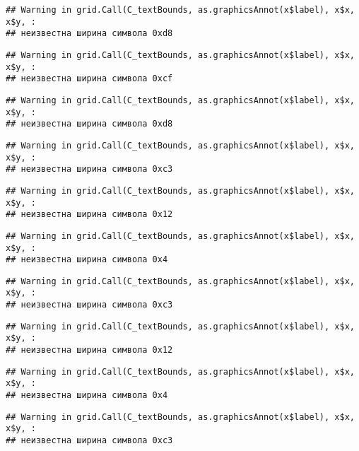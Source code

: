\documentclass[
]{article}
\begin{document}
\begin{verbatim}
## Warning in grid.Call(C_textBounds, as.graphicsAnnot(x$label), x$x, x$y, :
## неизвестна ширина символа 0xd8
\end{verbatim}

\begin{verbatim}
## Warning in grid.Call(C_textBounds, as.graphicsAnnot(x$label), x$x, x$y, :
## неизвестна ширина символа 0xcf
\end{verbatim}

\begin{verbatim}
## Warning in grid.Call(C_textBounds, as.graphicsAnnot(x$label), x$x, x$y, :
## неизвестна ширина символа 0xd8
\end{verbatim}

\begin{verbatim}
## Warning in grid.Call(C_textBounds, as.graphicsAnnot(x$label), x$x, x$y, :
## неизвестна ширина символа 0xc3
\end{verbatim}

\begin{verbatim}
## Warning in grid.Call(C_textBounds, as.graphicsAnnot(x$label), x$x, x$y, :
## неизвестна ширина символа 0x12
\end{verbatim}

\begin{verbatim}
## Warning in grid.Call(C_textBounds, as.graphicsAnnot(x$label), x$x, x$y, :
## неизвестна ширина символа 0x4
\end{verbatim}

\begin{verbatim}
## Warning in grid.Call(C_textBounds, as.graphicsAnnot(x$label), x$x, x$y, :
## неизвестна ширина символа 0xc3
\end{verbatim}

\begin{verbatim}
## Warning in grid.Call(C_textBounds, as.graphicsAnnot(x$label), x$x, x$y, :
## неизвестна ширина символа 0x12
\end{verbatim}

\begin{verbatim}
## Warning in grid.Call(C_textBounds, as.graphicsAnnot(x$label), x$x, x$y, :
## неизвестна ширина символа 0x4
\end{verbatim}

\begin{verbatim}
## Warning in grid.Call(C_textBounds, as.graphicsAnnot(x$label), x$x, x$y, :
## неизвестна ширина символа 0xc3
\end{verbatim}
\end{document}
